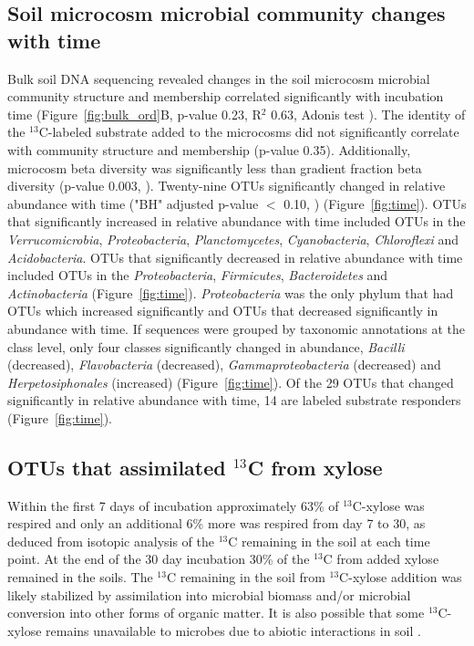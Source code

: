 \subsection{Soil microcosm microbial community changes with time}
Bulk soil DNA sequencing revealed changes in the soil microcosm microbial
community structure and membership correlated significantly with incubation
time (Figure~\ref{fig:bulk_ord}B, p-value 0.23, R$^{2}$ 0.63, Adonis test
\citet{Anderson2001a}). The identity of the $^{13}$C-labeled substrate added to
the microcosms did not significantly correlate with community structure and
membership (p-value 0.35). Additionally, microcosm beta diversity was
significantly less than gradient fraction beta diversity (p-value 0.003,
\citet{Anderson2006}). Twenty-nine OTUs significantly changed in relative
abundance with time ("BH" adjusted p-value $<$ 0.10, \citet{YBenjamini1995})
(Figure~\ref{fig:time}). OTUs that significantly increased in relative
abundance with time included OTUs in the \textit{Verrucomicrobia},
\textit{Proteobacteria}, \textit{Planctomycetes}, \textit{Cyanobacteria},
\textit{Chloroflexi} and \textit{Acidobacteria}. OTUs that significantly
decreased in relative abundance with time included OTUs in the
\textit{Proteobacteria}, \textit{Firmicutes}, \textit{Bacteroidetes} and
\textit{Actinobacteria} (Figure~\ref{fig:time}). \textit{Proteobacteria} was
the only phylum that had OTUs which increased significantly and OTUs that
decreased significantly in abundance with time. If sequences were grouped by
taxonomic annotations at the class level, only four classes significantly
changed in abundance, \textit{Bacilli} (decreased), \textit{Flavobacteria}
(decreased), \textit{Gammaproteobacteria} (decreased) and
\textit{Herpetosiphonales} (increased) (Figure~\ref{fig:time}). Of the 29 OTUs
that changed significantly in relative abundance with time, 14 are labeled
substrate responders (Figure~\ref{fig:time}).

\subsection{OTUs that assimilated $^{13}$C from xylose}
Within the first 7 days of
incubation approximately 63\% of $^{13}$C-xylose was respired and only an
additional 6\% more was respired from day 7 to 30, as deduced from isotopic analysis of the $^{13}$C remaining in the soil at each time point. At the end of the 30 day
incubation 30\% of the $^{13}$C from added xylose remained in the soils. The
$^{13}$C remaining in the soil from $^{13}$C-xylose addition was likely
stabilized by assimilation into microbial biomass and/or microbial conversion
into other forms of organic matter. It is also possible that some
$^{13}$C-xylose remains unavailable to microbes due to abiotic interactions in
soil \citep{Kalbitz_2000}. 

